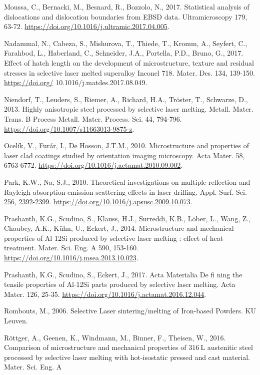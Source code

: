 \documentclass[10pt]{article}
\begin{document}
Moussa, C., Bernacki, M., Besnard, R., Bozzolo, N., 2017. Statistical analysis of dislocations and dislocation boundaries from EBSD data. Ultramicroscopy 179, 63-72. \href{https://doi.org/10.1016/j.ultramic.2017.04.005}{https://doi.org/10.1016/j.ultramic.2017.04.005}.

Nadammal, N., Cabeza, S., Mishurova, T., Thiede, T., Kromm, A., Seyfert, C., Farahbod, L., Haberland, C., Schneider, J.A., Portella, P.D., Bruno, G., 2017. Effect of hatch length on the development of microstructure, texture and residual stresses in selective laser melted superalloy Inconel 718. Mater. Des. 134, 139-150. \href{https://doi.org/}{https://doi.org/} 10.1016/j.matdes.2017.08.049.

Niendorf, T., Leuders, S., Riemer, A., Richard, H.A., Tröster, T., Schwarze, D., 2013. Highly anisotropic steel processed by selective laser melting. Metall. Mater. Trans. B Process Metall. Mater. Process. Sci. 44, 794-796. \href{https://doi.org/10.1007/s11663013-9875-z}{https://doi.org/10.1007/s11663013-9875-z}.

Ocelík, V., Furár, I., De Hosson, J.T.M., 2010. Microstructure and properties of laser clad coatings studied by orientation imaging microscopy. Acta Mater. 58, 6763-6772. \href{https://doi.org/10.1016/j.actamat.2010.09.002}{https://doi.org/10.1016/j.actamat.2010.09.002}.

Park, K.W., Na, S.J., 2010. Theoretical investigations on multiple-reflection and Rayleigh absorption-emission-scattering effects in laser drilling. Appl. Surf. Sci. 256, 2392-2399. \href{https://doi.org/10.1016/j.apsusc.2009.10.073}{https://doi.org/10.1016/j.apsusc.2009.10.073}.

Prashanth, K.G., Scudino, S., Klauss, H.J., Surreddi, K.B., Löber, L., Wang, Z., Chaubey, A.K., Kühn, U., Eckert, J., 2014. Microstructure and mechanical properties of Al 12Si produced by selective laser melting : effect of heat treatment. Mater. Sci. Eng. A 590, 153-160. \href{https://doi.org/10.1016/j.msea.2013.10.023}{https://doi.org/10.1016/j.msea.2013.10.023}.

Prashanth, K.G., Scudino, S., Eckert, J., 2017. Acta Materialia De fi ning the tensile properties of Al-12Si parts produced by selective laser melting. Acta Mater. 126, 25-35. \href{https://doi.org/10.1016/j.actamat.2016.12.044}{https://doi.org/10.1016/j.actamat.2016.12.044}.

Rombouts, M., 2006. Selective Laser sintering/melting of Iron-based Powders. KU Leuven.

Röttger, A., Geenen, K., Windmann, M., Binner, F., Theisen, W., 2016. Comparison of microstructure and mechanical properties of $316 \mathrm{~L}$ austenitic steel processed by selective laser melting with hot-isostatic pressed and cast material. Mater. Sci. Eng. A
\end{document}
